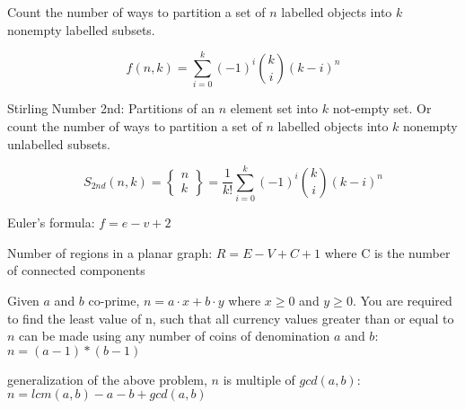 Count the number of ways to partition a set of $n$ labelled objects into $k$ nonempty labelled subsets.

$$f(n, k) = \sum_{i=0}^{k}(-1)^i\binom{k}{i}(k-i)^n$$

Stirling Number 2nd: Partitions of an $n$ element set into $k$ not-empty set. 
Or count the number of ways to partition a set of $n$ labelled objects into $k$ nonempty unlabelled subsets.

$$S_{2nd}(n, k) = \begin{Bmatrix} n \\ k \end{Bmatrix} = \frac{1}{k!}\sum_{i=0}^{k}(-1)^i\binom{k}{i}(k-i)^n$$

Euler's formula: $f = e - v + 2$

Number of regions in a planar graph: $R = E - V + C + 1$ where C is the number of connected components

Given $a$ and $b$ co-prime, $n = a \cdot x + b \cdot y$ where $x \ge 0$ and $y \ge 0$. 
You are required to find the least value of n, such that all currency values greater than or equal to $n$ can be made using any number of coins of denomination $a$ and $b$: $n = (a-1)*(b-1)$

generalization of the above problem, $n$ is multiple of $gcd(a, b)$: $n = lcm(a, b) - a - b + gcd(a, b)$